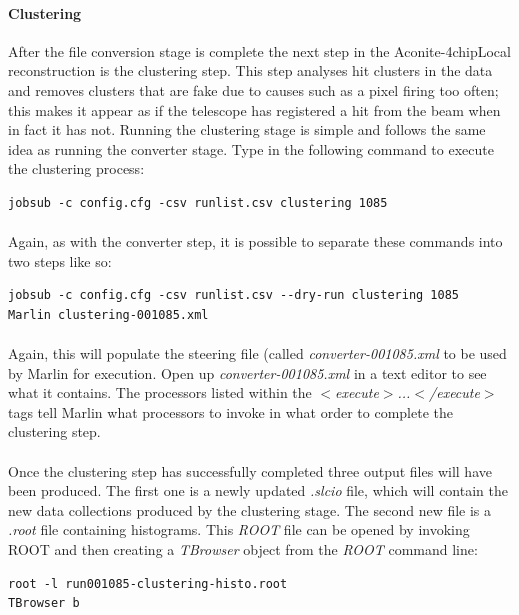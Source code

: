 \documentclass[11pt]{article}
\begin{document}
\paragraph{Clustering}
After the file conversion stage is complete the next step in the Aconite-4chipLocal reconstruction is the clustering step. This step analyses hit clusters in the data and removes clusters that are fake due to causes such as a pixel firing too often; this makes it appear as if the telescope has registered a hit from the beam when in fact it has not. Running the clustering stage is simple and follows the same idea as running the converter stage. Type in the following command to execute the clustering process:
\begin{verbatim}
jobsub -c config.cfg -csv runlist.csv clustering 1085
\end{verbatim}
\paragraph{}
Again, as with the converter step, it is possible to separate these commands into two steps like so:
\begin{verbatim}
jobsub -c config.cfg -csv runlist.csv --dry-run clustering 1085
Marlin clustering-001085.xml
\end{verbatim}
\paragraph{}
Again, this will populate the steering file (called \textit{converter-001085.xml} to be used by Marlin for execution. Open up \textit{converter-001085.xml} in a text editor to see what it contains. The processors listed within the \textit{$<$execute$>$...$<$/execute$>$} tags tell Marlin what processors to invoke in what order to complete the clustering step.
\paragraph{}
Once the clustering step has successfully completed three output files will have been produced. The first one is a newly updated \textit{.slcio} file, which will contain the new data collections produced by the clustering stage. The second new file is a \textit{.root} file containing histograms. This \textit{ROOT} file can be opened by invoking ROOT and then creating a \textit{TBrowser} object from the \textit{ROOT} command line:
\begin{verbatim}
root -l run001085-clustering-histo.root
TBrowser b
\end{verbatim}
\end{document}
